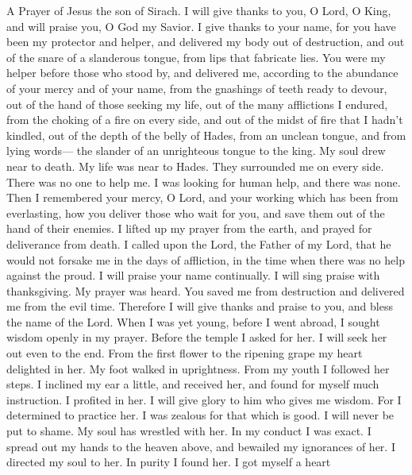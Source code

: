 A Prayer of Jesus the son of Sirach.  I will give thanks to
you, O Lord, O King, and will praise you, O God my Savior. I give thanks
to your name,  for you have been my protector and helper,
and delivered my body out of destruction, and out of the snare of a
slanderous tongue, from lips that fabricate lies. You were my helper
before those who stood by,  and delivered me, according to
the abundance of your mercy and of your name, from the gnashings of
teeth ready to devour, out of the hand of those seeking my life, out of
the many afflictions I endured,  from the choking of a fire
on every side, and out of the midst of fire that I hadn't kindled,
 out of the depth of the belly of Hades, from an unclean
tongue, and from lying words---  the slander of an
unrighteous tongue to the king. My soul drew near to death. My life was
near to Hades.  They surrounded me on every side. There was
no one to help me. I was looking for human help, and there was none.
 Then I remembered your mercy, O Lord, and your working
which has been from everlasting, how you deliver those who wait for you,
and save them out of the hand of their enemies.  I lifted up
my prayer from the earth, and prayed for deliverance from death.
 I called upon the Lord, the Father of my Lord, that he
would not forsake me in the days of affliction, in the time when there
was no help against the proud.  I will praise your name
continually. I will sing praise with thanksgiving. My prayer was heard.
 You saved me from destruction and delivered me from the
evil time. Therefore I will give thanks and praise to you, and bless the
name of the Lord.  When I was yet young, before I went
abroad, I sought wisdom openly in my prayer.  Before the
temple I asked for her. I will seek her out even to the end.
 From the first flower to the ripening grape my heart
delighted in her. My foot walked in uprightness. From my youth I
followed her steps.  I inclined my ear a little, and
received her, and found for myself much instruction.  I
profited in her. I will give glory to him who gives me wisdom.
 For I determined to practice her. I was zealous for that
which is good. I will never be put to shame.  My soul has
wrestled with her. In my conduct I was exact. I spread out my hands to
the heaven above, and bewailed my ignorances of her.  I
directed my soul to her. In purity I found her. I got myself a heart
